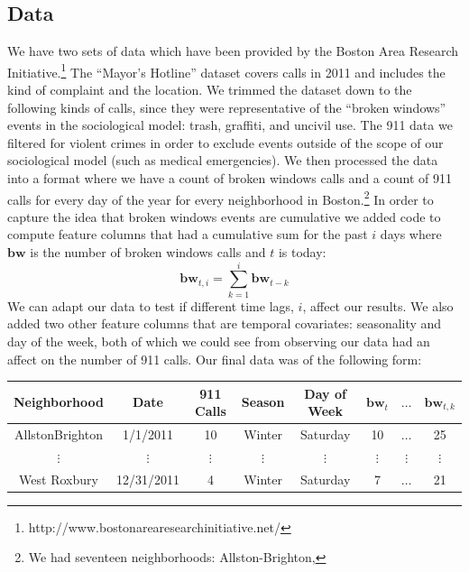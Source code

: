 \documentclass[a0,final]{a0poster}
\begin{document}
\begin{multicols}{3}
\section*{Data}
We have two sets of data which have been provided by the Boston Area Research Initiative.\footnote{http://www.bostonarearesearchinitiative.net/} The ``Mayor's Hotline'' dataset covers calls in 2011 and includes the kind of complaint and the location. We trimmed the dataset down to the following kinds of calls, since they were representative of the ``broken windows'' events in the sociological model: trash, graffiti, and uncivil use. The 911 data we filtered for violent crimes in order to exclude events outside of the scope of our sociological model (such as medical emergencies). We then processed the data into a format where we have a count of broken windows calls and a count of 911 calls for every day of the year for every neighborhood in Boston.\footnote{We had seventeen neighborhoods: Allston-Brighton,} In order to capture the idea that broken windows events are cumulative we added code to compute feature columns that had a cumulative sum for the past $i$ days where $\mathbf{bw}$ is the number of broken windows calls and $t$ is today:
$$ \mathbf{bw}_{t,i} = \sum_{k=1}^i \mathbf{bw}_{t-k}$$
We can adapt our data to test if different time lags, $i$, affect our results. We also added two other feature columns that are temporal covariates: seasonality and day of the week, both of which we could see from observing our data had an affect on the number of 911 calls. Our final data was of the following form:\\
\begin{center}
\begin{tabular}{cccccccc}
Neighborhood & Date & 911 Calls & Season & Day of Week & $\mathbf{bw}_{t}$  & $\hdots$ & $\mathbf{bw}_{t,k}$ \\
\hline
AllstonBrighton & 1/1/2011 & 10 & Winter & Saturday & 10 & $\hdots$ & 25\\
$\vdots$  & $\vdots$  & $\vdots$  & $\vdots$ & $\vdots$ & $\vdots$ & $\vdots$  & $\vdots$ \\
West Roxbury & 12/31/2011 & 4 & Winter & Saturday & 7& $\hdots$ & 21\\
\end{tabular}
\end{center}


\end{multicols}
\end{document}
